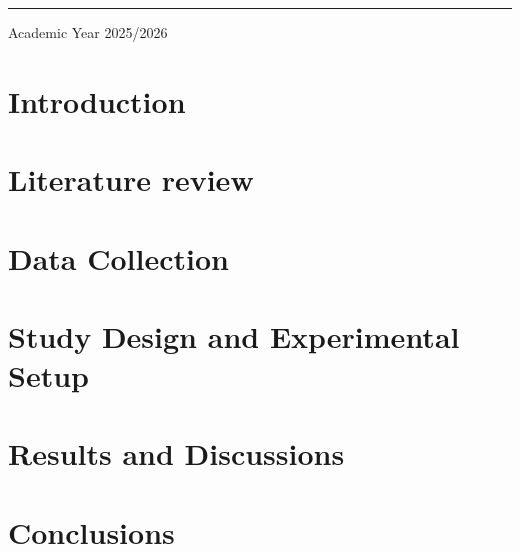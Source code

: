\documentclass[12pt]{report}
\begin{document}
\begin{titlepage}

\vspace{2.2cm}

\rule{0.78\textwidth}{0.4pt}

\vspace{0.45cm}

{\small
Academic Year 2025/2026
}

\end{titlepage}
\newpage
\null
\thispagestyle{empty}
\tableofcontents
\thispagestyle{empty}
\clearpage
\newpage
\null
\setcounter{page}{1}
\chapter*{Introduction}
\label{ch:intro}

\clearpage
\chapter{Literature review}
\label{ch:LiteratureReview}

\clearpage
\chapter{Data Collection}
\label{ch:dataset}

\clearpage
\chapter{Study Design and Experimental Setup}
\label{ch:MeMs}

\clearpage
\chapter{Results and Discussions}
\label{ch:results}

\clearpage
\chapter{Conclusions}
\label{ch:conclusion} 

\clearpage
\end{document}
